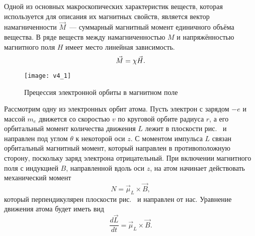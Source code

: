 
Одной из основных макроскопических характеристик веществ, которая используется для описания их магнитных свойств, является вектор намагниченности $\vec{M}$~--- суммарный магнитный момент единичного объёма вещества. В ряде веществ между намагниченностью $M$ и напряжённостью магнитного поля $H$ имеет место линейная зависимость.
\begin{equation}
	\eqmark{magnetization-magnetic vector}
	\vec{M} = \chi\vec{H}.
\end{equation}

\begin{wrapfigure}[23]{r}{0.35\textwidth}
	\texttt{[image: v4\_1]}
	\caption{Прецессия электронной орбиты в магнитном поле}
\end{wrapfigure}

Рассмотрим одну из электронных орбит атома. Пусть электрон с зарядом $-e$ и массой $m_e$ движется со скоростью $v$ по круговой орбите радиуса $r$, а его орбитальный момент количества движения $L$ лежит в плоскости рис.~ и направлен под углом $\theta$ к некоторой оси $z$. С моментом импульса $L$ связан орбитальный магнитный момент, который направлен в противоположную сторону, поскольку заряд электрона отрицательный. При включении магнитного поля с индукцией $B$, направленной вдоль оси $z$, на атом начинает действовать механический момент
\begin{equation*}
	N = \vec{\mu}_L\times \vec{B},
\end{equation*}
который перпендикулярен плоскости рис.~ и направлен от нас. Уравнение движения атома будет иметь вид
\begin{equation*}
	\frac{d\vec{L}}{dt} = \vec{\mu}_L\times \vec{B}.
\end{equation*}

